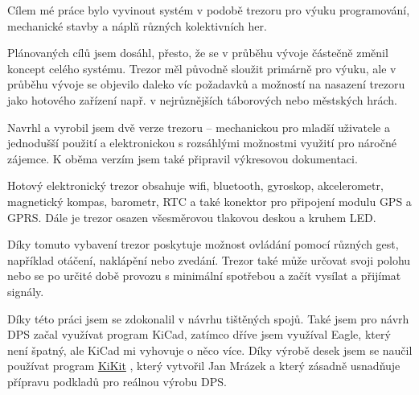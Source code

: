 \pagestyle{empty}
\pagestyle{plain}
{\setlength{\voffset}{-10mm} 

Cílem mé práce bylo vyvinout systém v podobě trezoru pro výuku programování, mechanické stavby a náplň různých kolektivních her. 

Plánovaných cílů jsem dosáhl, přesto, že se v průběhu vývoje částečně změnil koncept celého systému. Trezor měl původně sloužit primárně pro výuku, ale v průběhu vývoje 
se objevilo daleko víc požadavků a možností na nasazení trezoru jako hotového zařízení např. v nejrůznějších táborových nebo městských hrách. 

Navrhl a vyrobil jsem dvě verze trezoru -- mechanickou pro mladší uživatele a jednodušší použití a elektronickou s rozsáhlými možnostmi využití pro náročné zájemce. 
K oběma verzím jsem také připravil výkresovou dokumentaci. 

Hotový elektronický trezor obsahuje wifi, bluetooth, gyroskop, akcelerometr,
magnetický kompas, barometr, RTC a také konektor pro připojení modulu GPS a GPRS. 
Dále je trezor osazen všesměrovou tlakovou deskou a kruhem LED.

Díky tomuto vybavení trezor poskytuje možnost 
ovládání pomocí různých gest, například otáčení, naklápění nebo zvedání. 
Trezor také může určovat svoji polohu nebo se po určité době 
provozu s minimální spotřebou  a začít vysílat a přijímat signály.



Díky této práci jsem se zdokonalil v návrhu tištěných spojů. Také jsem pro návrh DPS začal využívat program KiCad, zatímco dříve jsem využíval Eagle, který není špatný, ale KiCad 
mi vyhovuje o něco více. Díky výrobě desek jsem se naučil používat program \href{https://github.com/yaqwsx/KiKit}{KiKit} \parencite{KiKit}, 
který vytvořil Jan Mrázek a který zásadně usnadňuje přípravu podkladů pro reálnou výrobu DPS.
}

